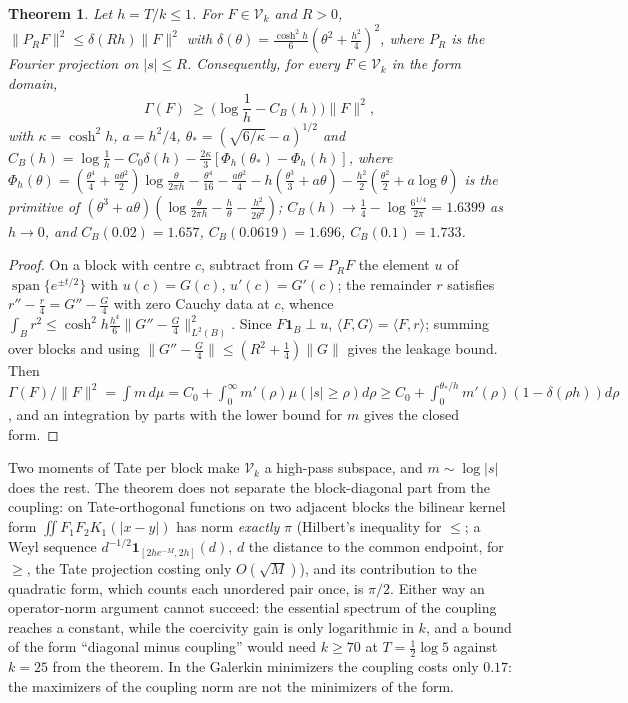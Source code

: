 \documentclass[11pt]{amsart}
\newtheorem{theorem}{Theorem}[section]
\theoremstyle{definition}
\theoremstyle{remark}
\begin{document}
\begin{theorem}\label{thm:B}
Let $h=T/k\le1$. For $F\in\mathcal V_k$ and $R>0$, $\|P_RF\|^2\le\delta(Rh)\|F\|^2$ with
$\delta(\theta)=\frac{\cosh^2h}6(\theta^2+\frac{h^2}4)^2$, where $P_R$ is the Fourier projection on $|s|\le R$.
Consequently, for every $F\in\mathcal V_k$ in the form domain,
\[
\Gamma(F)\ \ge\ \Big(\log\frac1h-C_B(h)\Big)\|F\|^2,
\]
with $\kappa=\cosh^2h$, $a=h^2/4$, $\theta_*=(\sqrt{6/\kappa}-a)^{1/2}$ and
$C_B(h)=\log\frac1h-C_0\delta(h)-\frac{2\kappa}3[\Phi_h(\theta_*)-\Phi_h(h)]$, where
$\Phi_h(\theta)=(\frac{\theta^4}4+\frac{a\theta^2}2)\log\frac\theta{2\pi h}-\frac{\theta^4}{16}-\frac{a\theta^2}4-h(\frac{\theta^3}3+a\theta)-\frac{h^2}2(\frac{\theta^2}2+a\log\theta)$
is the primitive of $(\theta^3+a\theta)(\log\frac\theta{2\pi h}-\frac h\theta-\frac{h^2}{2\theta^2})$; $C_B(h)\to\frac14-\log\frac{6^{1/4}}{2\pi}=1.6399$ as $h\to0$, and
$C_B(0.02)=1.657$, $C_B(0.0619)=1.696$, $C_B(0.1)=1.733$.
\end{theorem}
\begin{proof}
On a block with centre $c$, subtract from $G=P_RF$ the element $u$ of $\operatorname{span}\{e^{\pm t/2}\}$ with $u(c)=G(c)$,
$u'(c)=G'(c)$; the remainder $r$ satisfies $r''-\frac r4=G''-\frac G4$ with zero Cauchy data at $c$, whence
$\int_Br^2\le\cosh^2h\frac{h^4}6\|G''-\frac G4\|^2_{L^2(B)}$. Since $F\mathbf 1_B\perp u$, $\langle F,G\rangle=\langle F,r\rangle$;
summing over blocks and using $\|G''-\frac G4\|\le(R^2+\frac14)\|G\|$ gives the leakage bound. Then
$\Gamma(F)/\|F\|^2=\int m\,d\mu=C_0+\int_0^\infty m'(\rho)\mu(|s|\ge\rho)d\rho\ge C_0+\int_0^{\theta_*/h}m'(\rho)(1-\delta(\rho h))d\rho$,
and an integration by parts with the lower bound for $m$ gives the closed form.
\end{proof}
Two moments of Tate per block make $\mathcal V_k$ a high-pass subspace, and $m\sim\log|s|$ does the rest. The theorem
does not separate the block-diagonal part from the coupling: on Tate-orthogonal functions on two adjacent
blocks the bilinear kernel form $\iint F_1F_2K_1(|x-y|)$ has norm \emph{exactly} $\pi$ (Hilbert's inequality for $\le$; a Weyl sequence
$d^{-1/2}\mathbf 1_{[2he^{-M},2h]}(d)$, $d$ the distance to the common endpoint, for $\ge$, the Tate projection costing only
$O(\sqrt M)$), and its contribution to the quadratic form, which counts each unordered pair once, is $\pi/2$. Either way an
operator-norm argument cannot succeed: the essential spectrum of the coupling reaches a constant, while the coercivity gain is
only logarithmic in $k$, and a bound of the form ``diagonal minus coupling'' would need $k\ge70$ at $T=\frac12\log5$ against
$k=25$ from the theorem. In the Galerkin minimizers the coupling costs only $0.17$: the maximizers of the coupling norm are not
the minimizers of the form.
\end{document}
